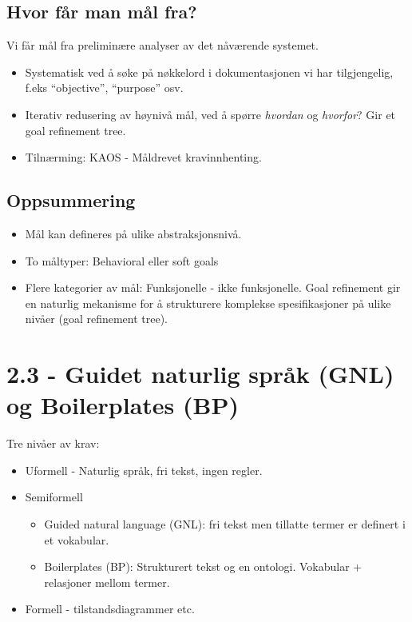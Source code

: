 \subsection{Hvor får man mål fra?}

Vi får mål fra preliminære analyser av det nåværende systemet.

\begin{itemize}
\item
  Systematisk ved å søke på nøkkelord i dokumentasjonen vi har
  tilgjengelig, f.eks ``objective'', ``purpose'' osv.
\item
  Iterativ redusering av høynivå mål, ved å spørre \emph{hvordan} og
  \emph{hvorfor}? Gir et goal refinement tree.
\item
  Tilnærming: KAOS - Måldrevet kravinnhenting.
\end{itemize}
\subsection{Oppsummering}

\begin{itemize}
\item
  Mål kan defineres på ulike abstraksjonsnivå.
\item
  To måltyper: Behavioral eller soft goals
\item
  Flere kategorier av mål: Funksjonelle - ikke funksjonelle. Goal
  refinement gir en naturlig mekanisme for å strukturere komplekse
  spesifikasjoner på ulike nivåer (goal refinement tree).
\end{itemize}
\section{2.3 - Guidet naturlig språk (GNL) og Boilerplates (BP)}

Tre nivåer av krav:

\begin{itemize}
\item
  Uformell - Naturlig språk, fri tekst, ingen regler.
\item
  Semiformell
  \begin{itemize}
  \item
    Guided natural language (GNL): fri tekst men tillatte termer er
    definert i et vokabular.
  \item
    Boilerplates (BP): Strukturert tekst og en ontologi. Vokabular +
    relasjoner mellom termer.
  \end{itemize}
\item
  Formell - tilstandsdiagrammer etc.
\end{itemize}
